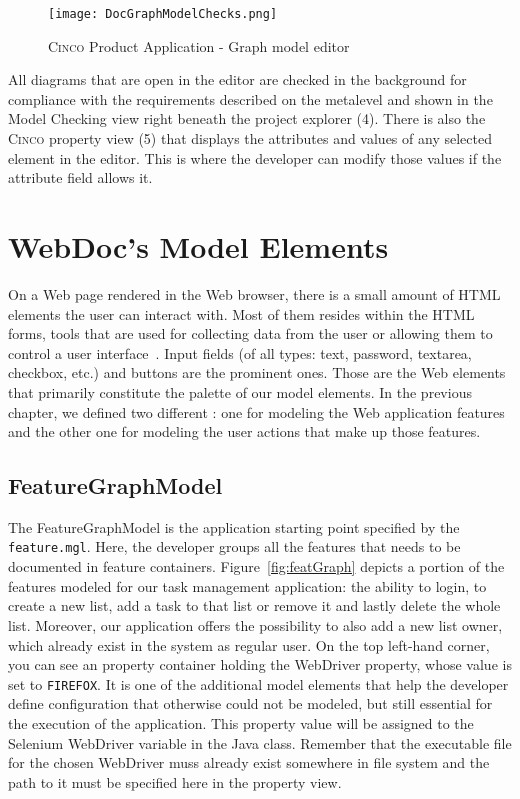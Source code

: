 \begin{figure}[h]
    \centering
    \texttt{[image: DocGraphModelChecks.png]}
    \caption{\textsc{Cinco} Product Application - Graph model editor}\label{fig:graphDSL}
\end{figure}

All diagrams that are open in the editor are checked in the background for compliance with the requirements described on the metalevel and shown in the Model Checking view right beneath the project explorer (4). There is also the \textsc{Cinco} property view (5) that displays the attributes and values of any selected element in the editor. This is where the developer can modify those values if the attribute field allows it.

\section{WebDoc's Model Elements}\label{sec:WebDocModelElem}

On a Web page rendered in the Web browser, there is a small amount of HTML elements the user can interact with. Most of them resides within the HTML forms, tools that are used for collecting data from the user or allowing them to control a user interface~\cite{mozillaMDN}. Input fields (of all types: text, password, textarea, checkbox, etc.) and buttons are the prominent ones. Those are the Web elements that primarily constitute the palette of our model elements. In the previous chapter, we defined two different : one for modeling the Web application features and the other one for modeling the user actions that make up those features.

\subsection{FeatureGraphModel}\label{sec:FeaGrahptModElem}

The FeatureGraphModel is the application starting point specified by the \lstinline{feature.mgl}. Here, the developer groups all the features that needs to be documented in feature containers. Figure~\ref{fig:featGraph} depicts a portion of the features modeled for our task management application: the ability to login, to create a new list, add a task to that list or remove it and lastly delete the whole list. Moreover, our application offers the possibility to also add a new list owner, which already exist in the system as regular user. On the top left-hand corner, you can see an property container holding the WebDriver property, whose value is set to \lstinline[language=MGL]{FIREFOX}. It is one of the additional model elements that help the developer define configuration that otherwise could not be modeled, but still essential for the execution of the application. This property value will be assigned to the Selenium WebDriver variable in the Java class. Remember that the executable file for the chosen WebDriver muss already exist somewhere in file system and the path to it must be specified here in the property view.

